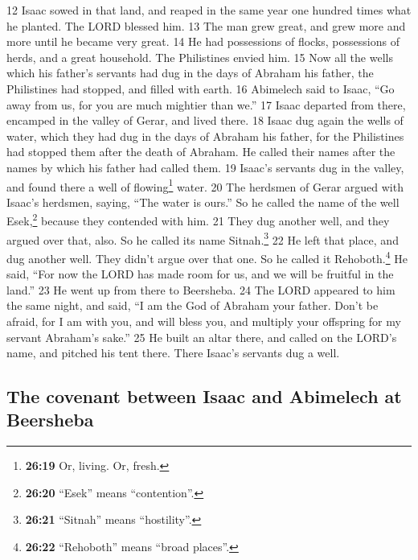 {12} Isaac sowed in that land, and reaped in the same year one hundred
times what he planted. The LORD blessed him. {13} The man grew great,
and grew more and more until he became very great. {14} He had
possessions of flocks, possessions of herds, and a great household. The
Philistines envied him. {15} Now all the wells which his father's
servants had dug in the days of Abraham his father, the Philistines had
stopped, and filled with earth. {16} Abimelech said to Isaac, ``Go away
from us, for you are much mightier than we.'' {17} Isaac departed from
there, encamped in the valley of Gerar, and lived there. {18} Isaac dug
again the wells of water, which they had dug in the days of Abraham his
father, for the Philistines had stopped them after the death of Abraham.
He called their names after the names by which his father had called
them. {19} Isaac's servants dug in the valley, and found there a well of
flowing\footnote{\textbf{26:19} Or, living. Or, fresh.} water. {20} The
herdsmen of Gerar argued with Isaac's herdsmen, saying, ``The water is
ours.'' So he called the name of the well Esek,\footnote{\textbf{26:20}
  ``Esek'' means ``contention''.} because they contended with him. {21}
They dug another well, and they argued over that, also. So he called its
name Sitnah.\footnote{\textbf{26:21} ``Sitnah'' means ``hostility''.}
{22} He left that place, and dug another well. They didn't argue over
that one. So he called it Rehoboth.\footnote{\textbf{26:22} ``Rehoboth''
  means ``broad places''.} He said, ``For now the LORD has made room for
us, and we will be fruitful in the land.'' {23} He went up from there to
Beersheba. {24} The LORD appeared to him the same night, and said, ``I
am the God of Abraham your father. Don't be afraid, for I am with you,
and will bless you, and multiply your offspring for my servant Abraham's
sake.'' {25} He built an altar there, and called on the LORD's name, and
pitched his tent there. There Isaac's servants dug a well.

\hypertarget{the-covenant-between-isaac-and-abimelech-at-beersheba}{%
\subsection{The covenant between Isaac and Abimelech at
Beersheba}\label{the-covenant-between-isaac-and-abimelech-at-beersheba}}

